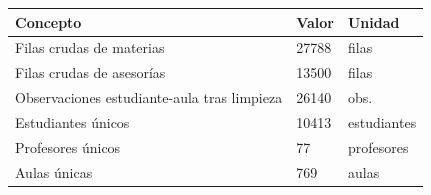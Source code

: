 \begin{tabular}{lll}
\toprule
Concepto & Valor & Unidad \\
\midrule
Filas crudas de materias & 27788 & filas \\
Filas crudas de asesorías & 13500 & filas \\
Observaciones estudiante-aula tras limpieza & 26140 & obs. \\
Estudiantes únicos & 10413 & estudiantes \\
Profesores únicos & 77 & profesores \\
Aulas únicas & 769 & aulas \\
\bottomrule
\end{tabular}
